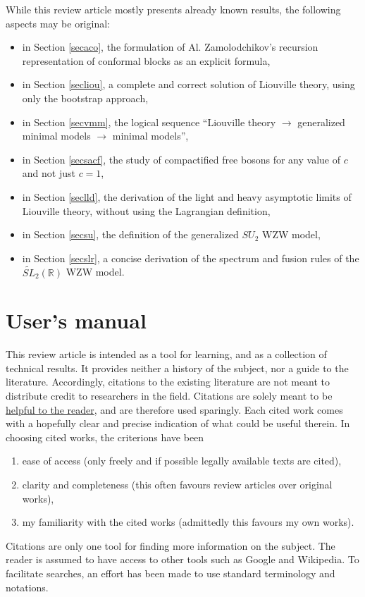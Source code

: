 \documentclass[12pt, a4paper, notitlepage, twoside]{report}
\numberwithin{equation}{section}
\theoremstyle{break}
\begin{document}
While this review article mostly presents already known results, the following aspects may be original:
\begin{itemize}
\item in Section \ref{secaco}, the formulation of Al. Zamolodchikov's recursion representation of conformal blocks as an explicit formula,
\item in Section \ref{secliou}, a complete and correct solution of Liouville theory, using only the bootstrap approach, 
\item in Section \ref{secvmm}, the logical sequence ``Liouville theory $\rightarrow$ generalized minimal models $\rightarrow$ minimal models'',
\item in Section \ref{secsacf}, the study of compactified free bosons for any value of $c$ and not just $c=1$,
\item in Section \ref{seclld}, the derivation of the light and heavy asymptotic limits of Liouville theory, without using the Lagrangian definition,
\item in Section \ref{secsu}, the definition of the generalized $SU_2$ WZW model,
\item in Section \ref{secslr}, a concise derivation of the spectrum and fusion rules of the $\widetilde{SL}_2(\mathbb{R})$ WZW model.
\end{itemize}


\section{User's manual}

This review article is intended as a tool for learning, and as a collection of technical results.
It provides neither a history of the subject, nor a guide to the literature.
Accordingly, citations to the existing literature are not meant to distribute credit to researchers in the field.
Citations are solely meant to be 
\href{http://researchpracticesandtools.blogspot.fr/2013/08/write-for-humans-not-for-robots.html}
{helpful to the reader}, and are therefore used sparingly.
Each cited work comes with a hopefully clear and precise indication of what could be useful therein.
In choosing cited works, the criterions have been
\begin{enumerate}
\item ease of access (only freely and if possible legally available texts are cited), 
\item clarity and completeness (this often favours review articles over original works),
\item my familiarity with the cited works (admittedly this favours my own works). 
\end{enumerate}
Citations are only one tool for finding more information on the subject. 
The reader is assumed to have access to other tools such as Google and Wikipedia. 
To facilitate searches, an effort has been made to use standard terminology and notations. 
\end{document}

